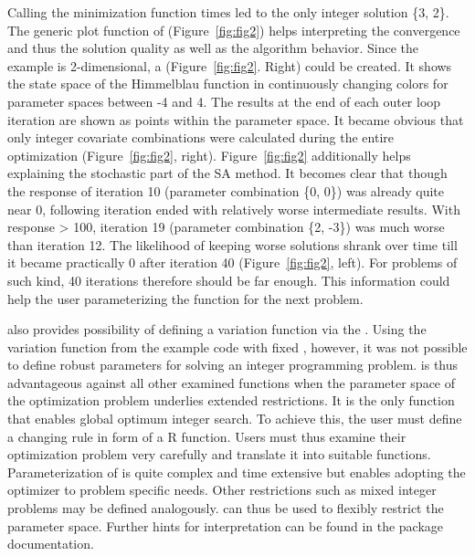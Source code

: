 Calling the minimization function times led to the only integer solution \{3, 2\}. The generic plot function of  (Figure~\ref{fig:fig2}) helps interpreting the convergence and thus the solution quality as well as the algorithm behavior. Since the example is 2-dimensional, a  (Figure~\ref{fig:fig2}. Right) could be created. It shows the state space of the Himmelblau function in continuously changing colors for parameter spaces between -4 and 4.  The results at the end of each outer loop iteration are shown as points within the parameter space. It became obvious that only integer covariate combinations were calculated during the entire optimization (Figure~\ref{fig:fig2}, right). Figure~\ref{fig:fig2} additionally helps explaining the stochastic part of the SA method. It becomes clear that though the response of iteration 10 (parameter combination \{0, 0\}) was already quite near 0, following iteration ended with relatively worse intermediate results. With response > 100, iteration 19 (parameter combination \{2, -3\}) was much worse than iteration 12. The likelihood of keeping worse solutions shrank over time till it became practically 0 after iteration 40 (Figure~\ref{fig:fig2}, left). For problems of such kind, 40 iterations therefore should be far enough. This information could help the user parameterizing the function for the next problem.

 also provides possibility of defining a variation function via the . Using the variation function from the example code with fixed , however, it was not possible to define robust parameters for solving an integer programming problem.  is thus advantageous against all other examined functions when the parameter space of the optimization problem underlies extended restrictions. It is the only function that enables global optimum integer search. To achieve this, the user must define a changing rule in form of a R function. Users must thus examine their optimization problem very carefully and translate it into suitable functions. Parameterization of  is quite complex and time extensive but enables adopting the optimizer to problem specific needs. Other restrictions such as mixed integer problems may be defined analogously.  can thus be used to flexibly restrict the parameter space. Further hints for interpretation can be found in the package documentation.

